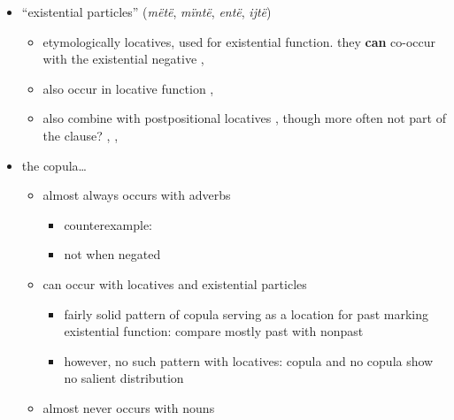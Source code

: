 \documentclass{memoir}
\begin{document}
\begin{itemize}
\tightlist
\item
  ``existential particles'' (\emph{mëtë}, \emph{mïntë}, \emph{entë},
  \emph{ijtë})

  \begin{itemize}
  \tightlist
  \item
    etymologically locatives, used for existential function. they
    \textbf{can} co-occur with the existential negative 
    ,
  \item
    also occur in locative function
    ,
  \item
    also combine with postpositional locatives ,
    though more often not part of the clause?
    , ,
  \end{itemize}
\item
  the copula\ldots{}

  \begin{itemize}
  \tightlist
  \item
    almost always occurs with adverbs

    \begin{itemize}
    \tightlist
    \item
      counterexample: 
    \item
      not when negated 
    \end{itemize}
  \item
    can occur with locatives and existential particles

    \begin{itemize}
    \tightlist
    \item
      fairly solid pattern of copula serving as a location for past
      marking existential function: compare mostly past
       with nonpast
    \item
      however, no such pattern with locatives: copula
       and no copula
       show no salient distribution
    \end{itemize}
  \item
    almost never occurs with nouns


\end{itemize}
\end{itemize}
\end{document}
